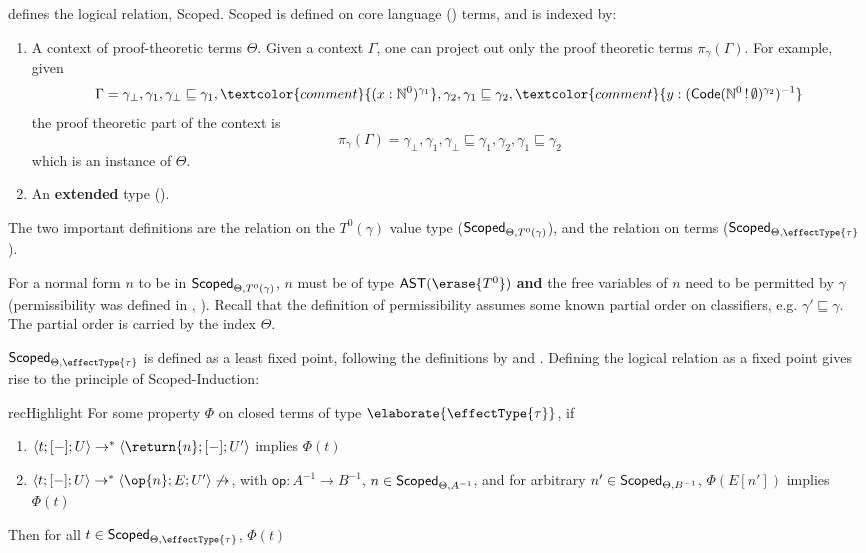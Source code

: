  defines the logical relation, \textsf{Scoped}. \textsf{Scoped} is defined on core language (\coreLang{}) terms, and is indexed by:
\begin{enumerate}
  \item A context of proof-theoretic terms $\Theta$. Given a context $\Gamma$, one can project out only the proof theoretic terms $\pi_{\gamma}({\Gamma})$. For example, given 
  \[\Gamma = \gamma_\bot, \gamma_1, \gamma_\bot \sqsubseteq \gamma_1, \textcolor{comment}{(x:\mathbb{N}^0)^{\gamma_1}}, \gamma_2, \gamma_1 \sqsubseteq \gamma_2,  \textcolor{comment}{y:(\textsf{Code}(\mathbb{N}^0 \, ! \, \emptyset)^{\gamma_2})^{-1}}\]
  the proof theoretic part of the context is
  \[\pi_{\gamma}({\Gamma}) = \gamma_\bot, \gamma_1, \gamma_\bot \sqsubseteq \gamma_1, \gamma_2, \gamma_1 \sqsubseteq \gamma_2 \]
  which is an instance of $\Theta$.
  \item An \textbf{extended} \recLang{} type (). 
\end{enumerate}

The two important definitions are the relation on the $T^{0} (\gamma)$ value type ($\textsf{Scoped}_{{\Theta}, {T^{0} (\gamma)}}$), and the relation on terms ($\scoped{\effectType{\tau}}$). 

For a normal form $n$ to be in $\textsf{Scoped}_{{\Theta}, {T^{0} (\gamma)}}$, $n$ must be of type $\textsf{AST}(\erase{T^0})$ \textbf{and} the free variables of $n$ need to be permitted by $\gamma$ (permissibility was defined in , ). Recall that the definition of permissibility assumes some known partial order on classifiers, e.g. $\gamma' \sqsubseteq \gamma$. The partial order is carried by the index $\Theta$. 

$\scoped{\effectType{\tau}}$ is defined as a least fixed point, following the definitions by \citet{plotkin-2025} and \citet{kuchta-2023}. Defining the logical relation as a fixed point gives rise to the principle of \textsf{Scoped}-Induction:

\begin{definition}{recHighlight}
  For some property $\Phi$ on closed terms of type $\elaborate{\effectType{\tau}}$, if
  \begin{enumerate}
    \item $\langle t; [-]; U \rangle \to^{*} \langle \return{n};[-];U' \rangle$ implies $\Phi(t)$
    \item $\langle t; [-]; U \rangle \to^{*} \langle \op{n};E;U' \rangle \not\to$, with $\textsf{op}: A^{-1} \to B^{-1}$, $n \in \textsf{Scoped}_{{\Theta}, {A^{-1}}}$, and for arbitrary $n' \in \textsf{Scoped}_{{\Theta}, {B^{-1}}}$, $\Phi(E[n'])$ implies $\Phi(t)$
  \end{enumerate}
  Then for all $t \in \scoped{\effectType{\tau}}$, $\Phi(t)$
\end{definition}

